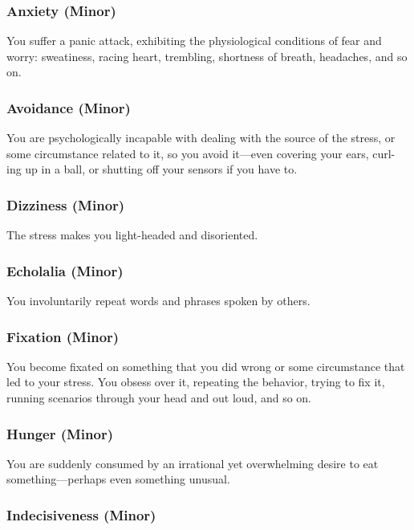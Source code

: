 \subsubsection{Anxiety (Minor)}

You suffer a panic attack, exhibiting the physiological 
conditions of fear and worry: sweatiness, racing heart, 
trembling, shortness of breath, headaches, and so on.

\subsubsection{Avoidance (Minor)}

You are psychologically incapable with dealing with 
the source of the stress, or some circumstance related 
to it, so you avoid it—even covering your ears, curl-
ing up in a ball, or shutting off your sensors if you 
have to.

\subsubsection{Dizziness (Minor)}

The stress makes you light-headed and disoriented.

\subsubsection{Echolalia (Minor)}

You involuntarily repeat words and phrases spoken 
by others.

\subsubsection{Fixation (Minor)}

You become fixated on something that you did wrong 
or some circumstance that led to your stress. You 
obsess over it, repeating the behavior, trying to fix it, 
running scenarios through your head and out loud, 
and so on.

\subsubsection{Hunger (Minor)}

You are suddenly consumed by an irrational yet 
overwhelming desire to eat something—perhaps even 
something unusual.

\subsubsection{Indecisiveness (Minor)}

